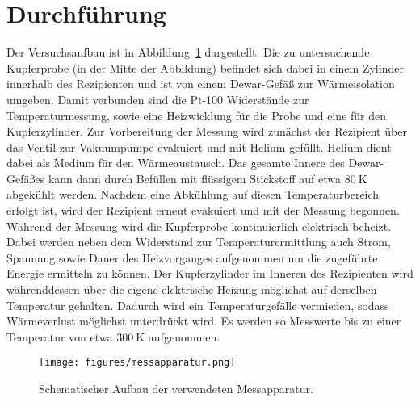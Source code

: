 \section{Durchführung}
\label{sec:durchführung}
%
Der Versuchsaufbau ist in Abbildung~\ref{fig:aufbau} dargestellt. Die zu untersuchende Kupferprobe (in der Mitte der Abbildung)
befindet sich dabei in einem Zylinder innerhalb des Rezipienten und ist von einem Dewar-Gefäß zur Wärmeisolation umgeben. Damit
verbunden sind die Pt-100 Widerstände zur Temperaturmessung, sowie eine Heizwicklung für die Probe und eine für den Kupferzylinder.
Zur Vorbereitung der Messung wird zunächst der Rezipient über das Ventil zur Vakuumpumpe evakuiert und mit Helium gefüllt. Helium
dient dabei als Medium für den Wärmeaustausch. Das gesamte Innere des Dewar-Gefäßes kann dann durch Befüllen mit flüssigem
Stickstoff auf etwa $\SI{80}{\kelvin}$ abgekühlt werden. Nachdem eine Abkühlung auf diesen Temperaturbereich erfolgt ist, wird der
Rezipient erneut evakuiert und mit der Messung begonnen.
Während der Messung wird die Kupferprobe kontinuierlich elektrisch beheizt. Dabei werden neben dem Widerstand zur
Temperaturermittlung auch Strom, Spannung sowie Dauer des Heizvorganges aufgenommen um die zugeführte Energie ermitteln zu können.
Der Kupferzylinder im Inneren des Rezipienten wird währenddessen über die eigene elektrische Heizung möglichst auf derselben
Temperatur gehalten. Dadurch wird ein Temperaturgefälle vermieden, sodass Wärmeverlust möglichst unterdrückt wird. Es werden so
Messwerte bis zu einer Temperatur von etwa $\SI{300}{\kelvin}$ aufgenommen.

\begin{figure}
    \centering
    \texttt{[image: figures/messapparatur.png]}
    \caption{Schematischer Aufbau der verwendeten Messapparatur.\cite{V47}}
    \label{fig:aufbau}
\end{figure}
